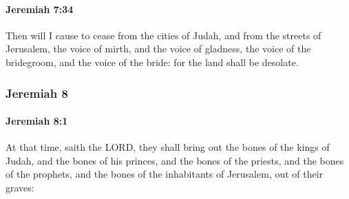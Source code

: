 		\paragraph{Jeremiah 7:34} %
			\label{JEREMIAH-7-34}

			Then will I cause to cease from the cities of Judah, and from the streets of Jerusalem, the voice of mirth, and the voice of gladness, the voice of the bridegroom, and the voice of the bride: for the land shall be desolate.

	\subsubsection{Jeremiah 8} %
		\label{JEREMIAH-8}

		\paragraph{Jeremiah 8:1} %
			\label{JEREMIAH-8-1}

			At that time, saith the LORD, they shall bring out the bones of the kings of Judah, and the bones of his princes, and the bones of the priests, and the bones of the prophets, and the bones of the inhabitants of Jerusalem, out of their graves:

